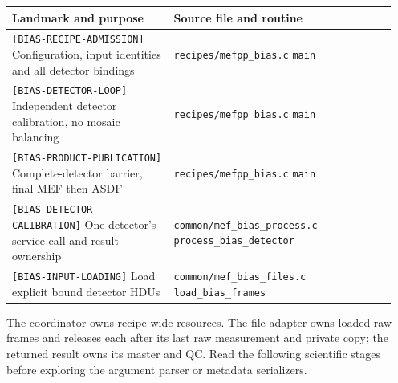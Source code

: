 \documentclass[11pt,a4paper]{article}
\newcommand{\code}[1]{\nolinkurl{#1}}
\begin{document}
\small
\begin{longtable}{@{}p{0.40\linewidth}p{0.55\linewidth}@{}}
\toprule
Landmark and purpose & Source file and routine \\
\midrule
\endhead
\code{[BIAS-RECIPE-ADMISSION]}\newline
Configuration, input identities and all detector bindings &
\code{recipes/mefpp_bias.c}\newline
\code{main} \\[4pt]
\code{[BIAS-DETECTOR-LOOP]}\newline
Independent detector calibration, no mosaic balancing &
\code{recipes/mefpp_bias.c}\newline
\code{main} \\[4pt]
\code{[BIAS-PRODUCT-PUBLICATION]}\newline
Complete-detector barrier, final MEF then ASDF &
\code{recipes/mefpp_bias.c}\newline
\code{main} \\[4pt]
\code{[BIAS-DETECTOR-CALIBRATION]}\newline
One detector's service call and result ownership &
\code{common/mef_bias_process.c}\newline
\code{process_bias_detector} \\[4pt]
\code{[BIAS-INPUT-LOADING]}\newline
Load explicit bound detector HDUs &
\code{common/mef_bias_files.c}\newline
\code{load_bias_frames} \\[4pt]
\bottomrule
\end{longtable}
\normalsize
The coordinator owns recipe-wide resources. The file adapter owns loaded raw
frames and releases each after its last raw measurement and private copy;
the returned result
owns its master and QC. Read the following scientific stages before exploring
the argument parser or metadata serializers.

\newpage
\end{document}
